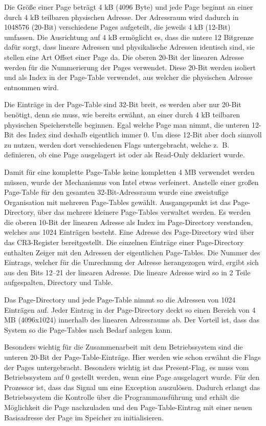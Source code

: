 \documentclass[12pt]{book}
\begin{document}
Die Größe einer Page beträgt 4 kB (4096 Byte) und jede Page beginnt an einer
durch 4 kB teilbaren physischen Adresse. Der Adressraum wird dadurch in 1048576
(20-Bit) verschiedene Pages aufgeteilt, die jeweils 4 kB (12-Bit) umfassen. Die
Ausrichtung auf 4 kB ermöglicht es, dass die untere 12 Bitgrenze dafür sorgt,
dass lineare Adressen und physikalische Adressen identisch sind, sie stellen
eine Art Offset einer Page da. Die oberen 20-Bit der linearen Adresse werden
für die Nummerierung der Pages verwendet. Diese 20-Bit werden isoliert und als
Index in der Page-Table verwendet, aus welcher die physischen Adresse entnommen
wird.

Die Einträge in der Page-Table sind 32-Bit breit, es werden aber nur 20-Bit
benötigt, denn sie muss, wie bereits erwähnt, an einer durch 4 kB teilbaren
physischen Speicherstelle beginnen. Egal welche Page man nimmt, die unteren
12-Bit des Index sind deshalb eigentlich immer 0. Um diese 12-Bit aber doch
sinnvoll zu nutzen, werden dort verschiedenen Flags untergebracht, welche z. B.
definieren, ob eine Page ausgelagert ist oder als Read-Only deklariert wurde.

Damit für eine komplette Page-Table keine kompletten 4 MB verwendet werden
müssen, wurde der Mechanismus von Intel etwas verfeinert.  Anstelle einer
großen Page-Table für den gesamten 32-Bit-Adressraum wurde eine zweistufige
Organisation mit mehreren Page-Tables gewählt. Ausgangspunkt ist das
Page-Directory, über das mehrere kleinere Page-Tables verwaltet werden. Es
werden die oberen 10-Bit der linearen Adresse als Index im Page-Directory
verstanden, welches aus 1024 Einträgen besteht. Eine Adresse des Page-Directory
wird über das CR3-Register bereitgestellt. Die einzelnen Einträge einer
Page-Directory enthalten Zeiger mit den Adressen der eigentlichen Page-Tables.
Die Nummer des Eintrags, welcher für die Umrechnung der Adresse herangezogen
wird, ergibt sich aus den Bits 12–21 der linearen Adresse. Die lineare Adresse
wird so in 2 Teile aufgespalten, Directory und Table.

Das Page-Directory und jede Page-Table nimmt so die Adressen von 1024 Einträgen
auf. Jeder Eintrag in der Page-Directory deckt so einen Bereich von 4 MB
(4096x1024) innerhalb des linearen Adressraums ab. Der Vorteil ist, dass das
System so die Page-Tables nach Bedarf anlegen kann.

Besonders wichtig für die Zusammenarbeit mit dem Betriebssystem sind die
unteren 20-Bit der Page-Table-Einträge. Hier werden wie schon erwähnt die Flags
der Pages untergebracht. Besonders wichtig ist das Present-Flag, es muss vom
Betriebssystem auf 0 gestellt werden, wenn eine Page ausgelagert wurde. Für den
Prozessor ist, dass das Signal um eine Exception auszulösen. Dadurch erlangt
das Betriebssystem die Kontrolle über die Programmausführung und erhält die
Möglichkeit die Page nachzuladen und den Page-Table-Eintrag mit einer neuen
Basisadresse der Page im Speicher zu initialisieren.
\end{document}

